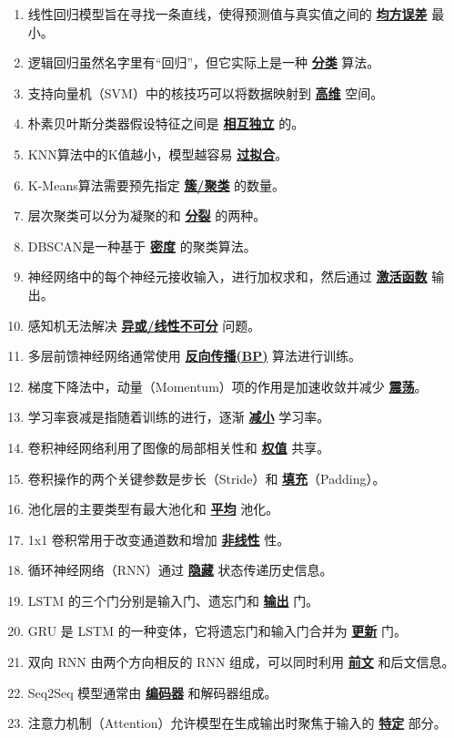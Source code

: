 \documentclass[12pt,a4paper,openany]{ctexbook}
\begin{document}
\begin{enumerate}[resume,leftmargin=2em,itemsep=1pt]
\item 线性回归模型旨在寻找一条直线，使得预测值与真实值之间的 \underline{\textbf{均方误差}} 最小。
\item 逻辑回归虽然名字里有“回归”，但它实际上是一种 \underline{\textbf{分类}} 算法。
\item 支持向量机（SVM）中的核技巧可以将数据映射到 \underline{\textbf{高维}} 空间。
\item 朴素贝叶斯分类器假设特征之间是 \underline{\textbf{相互独立}} 的。
\item KNN算法中的K值越小，模型越容易 \underline{\textbf{过拟合}}。
\item K-Means算法需要预先指定 \underline{\textbf{簇/聚类}} 的数量。
\item 层次聚类可以分为凝聚的和 \underline{\textbf{分裂}} 的两种。
\item DBSCAN是一种基于 \underline{\textbf{密度}} 的聚类算法。
\item 神经网络中的每个神经元接收输入，进行加权求和，然后通过 \underline{\textbf{激活函数}} 输出。
\item 感知机无法解决 \underline{\textbf{异或/线性不可分}} 问题。
\item 多层前馈神经网络通常使用 \underline{\textbf{反向传播(BP)}} 算法进行训练。
\item 梯度下降法中，动量（Momentum）项的作用是加速收敛并减少 \underline{\textbf{震荡}}。
\item 学习率衰减是指随着训练的进行，逐渐 \underline{\textbf{减小}} 学习率。
\item 卷积神经网络利用了图像的局部相关性和 \underline{\textbf{权值}} 共享。
\item 卷积操作的两个关键参数是步长（Stride）和 \underline{\textbf{填充}}（Padding）。
\item 池化层的主要类型有最大池化和 \underline{\textbf{平均}} 池化。
\item 1x1 卷积常用于改变通道数和增加 \underline{\textbf{非线性}} 性。
\item 循环神经网络（RNN）通过 \underline{\textbf{隐藏}} 状态传递历史信息。
\item LSTM 的三个门分别是输入门、遗忘门和 \underline{\textbf{输出}} 门。
\item GRU 是 LSTM 的一种变体，它将遗忘门和输入门合并为 \underline{\textbf{更新}} 门。
\item 双向 RNN 由两个方向相反的 RNN 组成，可以同时利用 \underline{\textbf{前文}} 和后文信息。
\item Seq2Seq 模型通常由 \underline{\textbf{编码器}} 和解码器组成。
\item 注意力机制（Attention）允许模型在生成输出时聚焦于输入的 \underline{\textbf{特定}} 部分。

\end{enumerate}
\end{document}
